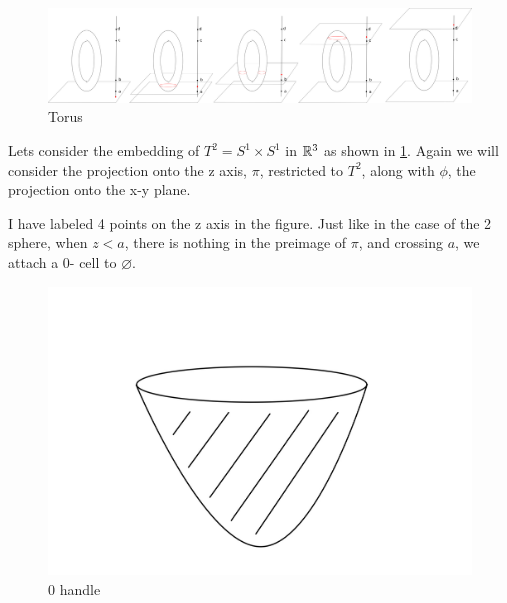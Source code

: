 \begin{figure}[h]
    \centering
    \includegraphics[width = .8\linewidth]{Images_Lect1/image.png}
    \caption{Torus}
    \label{fig:Torus}
\end{figure}
\begin{example}
Lets consider the embedding of $T^{2}= S^{1}\times S^{1}$ in $\mathbb{R}^{3}$ as shown in \ref{fig:Torus}. Again we will consider the projection onto the z axis, $\pi$, restricted to $T^{2}$, along with $\phi$, the projection onto the x-y plane. 

I have labeled 4 points on the z axis in the figure. Just like in the case of the 2 sphere, when $z < a$, there is nothing in the preimage of $\pi$, and crossing $a$, we attach a 0- cell to $\varnothing$.
\begin{figure}[h]
    \centering
    \includegraphics[width = .4\linewidth]{Images_Lect1/2disc.jpeg}
    \caption{0 handle}
    \label{fig:0handleT}
\end{figure}


\end{example}
